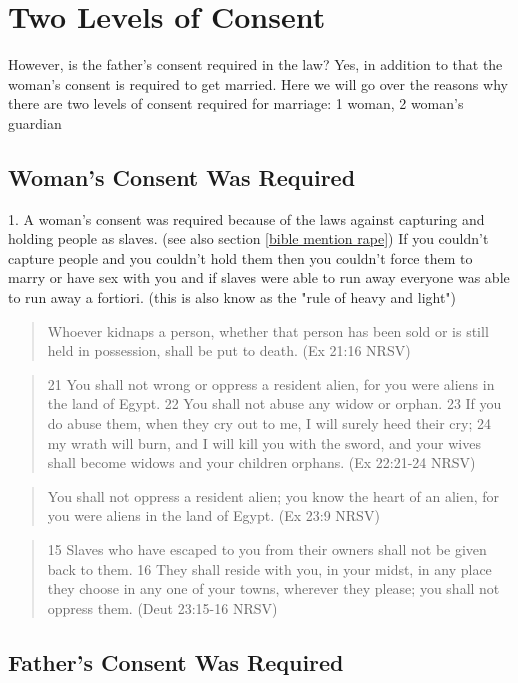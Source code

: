 \documentclass[11pt]{article}
\begin{document}
\section{Two Levels of Consent}
However, is the father's consent required in the law? Yes, in addition to that the woman's consent is required to get married. Here we will go over the reasons why there are two levels of consent required for marriage: 1 woman, 2 woman’s guardian

\subsection{Woman's Consent Was Required}

1. A woman’s consent was required because of the laws against capturing and holding people as slaves. (see also section \ref{bible mention rape}) If you couldn't capture people and you couldn't hold them then you couldn't force them to marry or have sex with you and if slaves were able to run away everyone was able to run away a fortiori. (this is also know as the "rule of heavy and light")
\begin{quote}
 Whoever kidnaps a person, whether that person has been sold or is still held in possession, shall be put to death. (Ex 21:16 NRSV)
\end{quote}
\begin{quote}
21 You shall not wrong or oppress a resident alien, for you were aliens in the land of Egypt. 22 You shall not abuse any widow or orphan. 23 If you do abuse them, when they cry out to me, I will surely heed their cry; 24 my wrath will burn, and I will kill you with the sword, and your wives shall become widows and your children orphans. (Ex 22:21-24 NRSV)
\end{quote}
\begin{quote}
You shall not oppress a resident alien; you know the heart of an alien, for you were aliens in the land of Egypt. (Ex 23:9 NRSV)
\end{quote}
\begin{quote}
15 Slaves who have escaped to you from their owners shall not be given back to them. 16 They shall reside with you, in your midst, in any place they choose in any one of your towns, wherever they please; you shall not oppress them. (Deut 23:15-16 NRSV)
\end{quote}

\subsection{Father's Consent Was Required}
\end{document}
